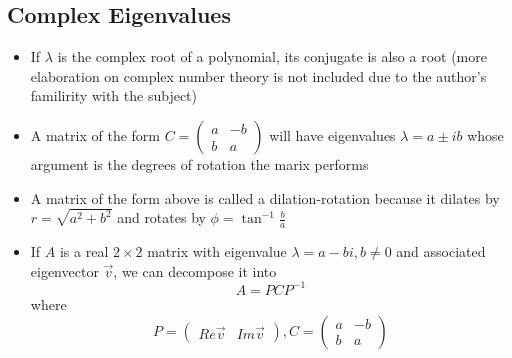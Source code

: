 \documentclass{article}
\begin{document}
\subsection{Complex Eigenvalues}
\begin{itemize}
    \item If \(\lambda\) is the complex root of a polynomial, its conjugate is also a root (more elaboration on complex number theory is not included due to the author's familirity with the subject)
    \item A matrix of the form \(C=\begin{pmatrix} a&-b\\b&a \end{pmatrix}\) will have eigenvalues \(\lambda=a\pm ib\) whose argument is the degrees of rotation the marix performs
    \item A matrix of the form above is called a dilation-rotation because it dilates by \(r=\sqrt{a^2+b^2}\) and rotates by \(\phi=\tan^{-1}{\frac{b}{a}}\)
    \item If \(A\) is a real \(2\times 2\) matrix with eigenvalue \(\lambda=a-bi, b\neq 0\) and associated eigenvector \(\vec{v}\), we can decompose it into \[A=PCP^{-1}\] where 
    \[P=\begin{pmatrix} Re \vec{v} & Im\vec{v} \end{pmatrix}, C=\begin{pmatrix} a&-b\\b&a \end{pmatrix}\]
\end{itemize}
\end{document}
